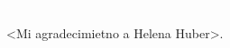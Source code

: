 \cleardoublepage
\thispagestyle{empty}
{\textcolor{white}{.}}
\vspace{40mm}
\epigraph{<Mi agradecimietno a Helena Huber>.}{}
\cleardoublepage

